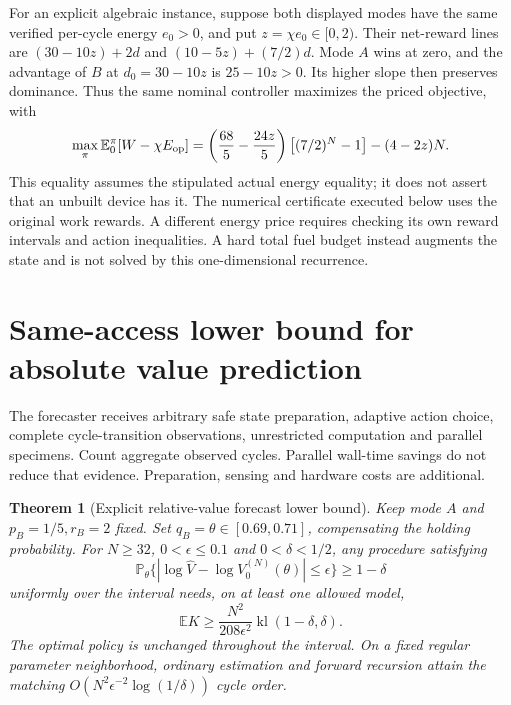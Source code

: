 \documentclass[10pt,a4paper]{article}
\newtheorem{theorem}{Theorem}\newtheorem{proposition}{Proposition}
\newcommand{\E}{\mathbb E}\newcommand{\Pp}{\mathbb P}
\newcommand{\kl}{\operatorname{kl}}\newcommand{\KL}{\operatorname{KL}}
\begin{document}
For an explicit algebraic instance, suppose both displayed modes have the same verified per-cycle energy $e_0>0$, and put $z=\chi e_0\in[0,2)$. Their net-reward lines are $(30-10z)+2d$ and $(10-5z)+(7/2)d$. Mode $A$ wins at zero, and the advantage of $B$ at $d_0=30-10z$ is $25-10z>0$. Its higher slope then preserves dominance. Thus the same nominal controller maximizes the priced objective, with
\[
\max_\pi\E_0^\pi[W-\chi E_{\rm op}]
=\left(\frac{68}{5}-\frac{24z}{5}\right)\big[(7/2)^N-1\big]-(4-2z)N.
\]
This equality assumes the stipulated actual energy equality; it does not assert that an unbuilt device has it. The numerical certificate executed below uses the original work rewards. A different energy price requires checking its own reward intervals and action inequalities. A hard total fuel budget instead augments the state and is not solved by this one-dimensional recurrence.

\section{Same-access lower bound for absolute value prediction}

The forecaster receives arbitrary safe state preparation, adaptive action choice, complete cycle-transition observations, unrestricted computation and parallel specimens. Count aggregate observed cycles. Parallel wall-time savings do not reduce that evidence. Preparation, sensing and hardware costs are additional.

\begin{theorem}[Explicit relative-value forecast lower bound]
Keep mode $A$ and $p_B=1/5,r_B=2$ fixed. Set $q_B=\theta\in[0.69,0.71]$, compensating the holding probability. For $N\ge32$, $0<\epsilon\le0.1$ and $0<\delta<1/2$, any procedure satisfying
\[
\Pp_\theta\{|\log\widehat V-\log V_0^{(N)}(\theta)|\le\epsilon\}\ge1-\delta
\]
uniformly over the interval needs, on at least one allowed model,
\begin{equation}
\boxed{\E K\ge\frac{N^2}{208\epsilon^2}\kl(1-\delta,\delta).}
\label{eq:lower}
\end{equation}
The optimal policy is unchanged throughout the interval. On a fixed regular parameter neighborhood, ordinary estimation and forward recursion attain the matching
$O(N^2\epsilon^{-2}\log(1/\delta))$ cycle order.
\end{theorem}
\end{document}
